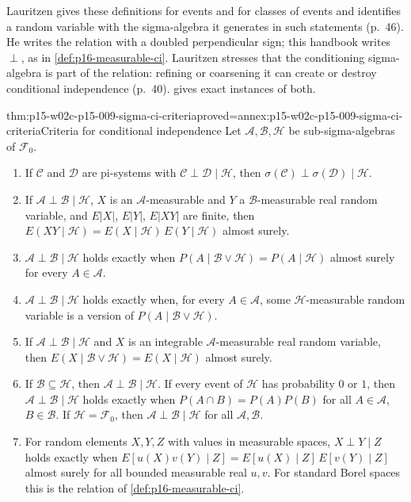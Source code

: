 Lauritzen gives these definitions for events and for classes of events
\cite[Definitions~2.1 and~2.5, pp.~40 and~42]{Lauritzen2019GraphicalLectures2020}
and identifies a random variable with the sigma-algebra it generates in
such statements (p.~46). He writes the relation with a doubled
perpendicular sign; this handbook writes \(\perp\), as in
\cref{def:p16-measurable-ci}. Lauritzen stresses that the conditioning
sigma-algebra is part of the relation: refining or coarsening it can create
or destroy conditional independence (p.~40).
 gives exact instances of both.

\begin{hbtheorem}{thm:p15-w02c-p15-009-sigma-ci-criteria}{proved=annex:p15-w02c-p15-009-sigma-ci-criteria}{Criteria for conditional independence}
Let \(\mathcal A,\mathcal B,\mathcal H\) be sub-sigma-algebras of
\(\mathcal F_0\).
\begin{enumerate}
\item If \(\mathcal C\) and \(\mathcal D\) are pi-systems with
      \(\mathcal C\perp\mathcal D\mid\mathcal H\), then
      \(\sigma(\mathcal C)\perp\sigma(\mathcal D)\mid\mathcal H\).
\item If \(\mathcal A\perp\mathcal B\mid\mathcal H\), \(X\) is an
      \(\mathcal A\)-measurable and \(Y\) a \(\mathcal B\)-measurable real
      random variable, and \(E|X|\), \(E|Y|\), \(E|XY|\) are finite, then
      \(E(XY\mid\mathcal H)=E(X\mid\mathcal H)\,E(Y\mid\mathcal H)\) almost
      surely.
\item \(\mathcal A\perp\mathcal B\mid\mathcal H\) holds exactly when
      \(P(A\mid\mathcal B\vee\mathcal H)=P(A\mid\mathcal H)\) almost surely
      for every \(A\in\mathcal A\).
\item \(\mathcal A\perp\mathcal B\mid\mathcal H\) holds exactly when, for
      every \(A\in\mathcal A\), some \(\mathcal H\)-measurable random
      variable is a version of \(P(A\mid\mathcal B\vee\mathcal H)\).
\item If \(\mathcal A\perp\mathcal B\mid\mathcal H\) and \(X\) is an
      integrable \(\mathcal A\)-measurable real random variable, then
      \(E(X\mid\mathcal B\vee\mathcal H)=E(X\mid\mathcal H)\) almost surely.
\item If \(\mathcal B\subseteq\mathcal H\), then
      \(\mathcal A\perp\mathcal B\mid\mathcal H\). If every event of
      \(\mathcal H\) has probability \(0\) or \(1\), then
      \(\mathcal A\perp\mathcal B\mid\mathcal H\) holds exactly when
      \(P(A\cap B)=P(A)P(B)\) for all \(A\in\mathcal A\), \(B\in\mathcal B\).
      If \(\mathcal H=\mathcal F_0\), then
      \(\mathcal A\perp\mathcal B\mid\mathcal H\) for all \(\mathcal A,\mathcal B\).
\item For random elements \(X,Y,Z\) with values in measurable spaces,
      \(X\perp Y\mid Z\) holds exactly when
      \(E[u(X)v(Y)\mid Z]=E[u(X)\mid Z]\,E[v(Y)\mid Z]\) almost surely for
      all bounded measurable real \(u,v\). For standard Borel spaces this is
      the relation of \cref{def:p16-measurable-ci}.
\end{enumerate}
\end{hbtheorem}

